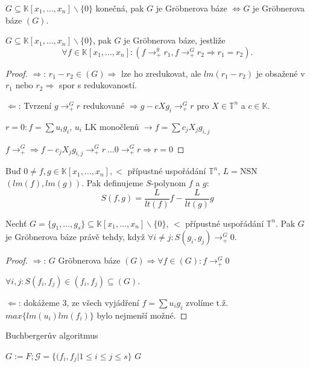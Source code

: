 \begin{defn}
    $G \subseteq \mathbb{K}[x_1,\dots,x_n]\backslash\{0\}$ konečná, pak $G$ je Gröbnerova báze $\Leftrightarrow G$ je Gröbnerova báze $(G)$.
\end{defn}

\begin{thm}
    $G \subseteq \mathbb{K}[x_1,\dots,x_n]\backslash\{0\}$, pak $G$ je Gröbnerova báze, jestliže
    \[
        \forall f \in \mathbb{K}[x_1,\dots,x_n]:(f\rightarrow^g_+r_1,f\rightarrow^G_+r_2 \Rightarrow r_1=r_2).
    \]
    \begin{proof}
        $\Rightarrow$: $r_1-r_2\in(G)\Rightarrow$ lze ho zredukovat, ale $lm(r_1-r_2)$ je obsažené v $r_1$ nebo $r_2 \Rightarrow$ spor s redukovaností.

        $\Leftarrow$: Tvrzení $g\rightarrow^G_+ r$ redukované $\Rightarrow g-cXg_i\rightarrow^G_+ r$ pro $X \in \mathbb{T}^n$ a $c \in \mathbb{K}$.

        $r=0:f=\sum u_ig_i$, $u_i$ LK monočlenů $\rightarrow f=\sum c_jX_jg_{i,j}$

        $f\rightarrow^G_+ \Rightarrow f-c_jX_jg_{i,j}\rightarrow^G_+r\ \dots 0\rightarrow^G_+r\Rightarrow r=0$
    \end{proof}
\end{thm}

\begin{defn}
    Buď $0\neq f,g \in \mathbb{K}[x_1,\dots,x_n],<$ přípustné uspořádání $\mathbb{T}^n$, $L=$NSN$(lm(f),lm(g))$. Pak definujeme $S$-polynom $f$ a $g$:
    \[
        S(f,g)=\frac{L}{lt(f)}f-\frac{L}{lt(g)}g
    \]
\end{defn}

\begin{thm}[Buchberger]
    Nechť $G=\{g_1,\dots,g_s\}\subseteq\mathbb{K}[x_1,\dots,x_n]\backslash\{0\}$, $<$ přípustné uspořádání $\mathbb{T}^n$. Pak $G$ je Gröbnerova báze právě tehdy, když $\forall i \neq j:S(g_i,g_j)\rightarrow^G_+0$.
    \begin{proof}
        $\Rightarrow$: $G$ Gröbnerova báze $(G)\Rightarrow\forall f \in (G):f\rightarrow^G_+0$

        $\forall i,j:S(f_i,f_j)\in(f_i,f_j)\subseteq (G).$

        $\Leftarrow$: dokážeme 3, ze všech vyjádření $f=\sum u_ig_i$ zvolíme t.ž. $max\{lm(u_i)lm(f_i)\}$ bylo nejmenší možné.
    \end{proof}
\end{thm}

\begin{algorithm}
    \caption{Buchbergerův algoritmus}
    $G:=F;\mathcal{G}=\{(f_i,f_j|1\leq i \leq j \leq s\}$\;
    \Return $G$
    \vspace{0.2cm}
\end{algorithm}

